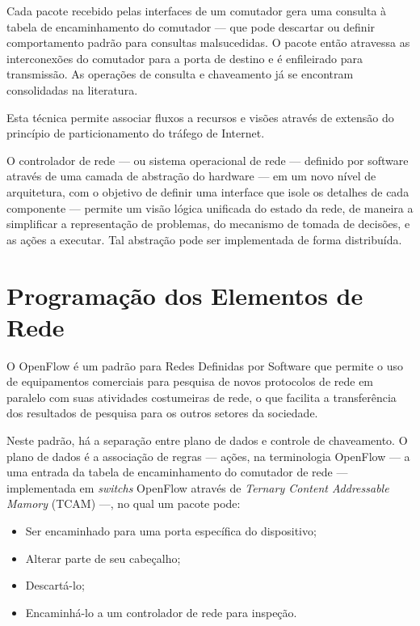 Cada pacote recebido pelas interfaces de um comutador gera uma consulta à tabela de encaminhamento do comutador --- que pode descartar ou definir comportamento padrão para consultas malsucedidas. O pacote então atravessa as interconexões do comutador para a porta de destino e é enfileirado para transmissão. As operações de consulta e chaveamento já se encontram consolidadas na literatura.

Esta técnica permite associar fluxos a recursos e visões através de extensão do princípio de particionamento do tráfego de Internet.

O controlador de rede --- ou sistema operacional de rede --- definido por software através de uma camada de abstração do hardware --- em um novo nível de arquitetura, com o objetivo de definir uma interface que isole os detalhes de cada componente --- permite um visão lógica unificada do estado da rede, de maneira a simplificar a representação de problemas, do mecanismo de tomada de decisões, e as ações a executar. Tal abstração pode ser implementada de forma distribuída.


\section*{Programação dos Elementos de Rede}

O OpenFlow é um padrão para Redes Definidas por Software que permite o uso de equipamentos comerciais para pesquisa de novos protocolos de rede em paralelo com suas atividades costumeiras de rede, o que facilita a transferência dos resultados de pesquisa para os outros setores da sociedade.

Neste padrão, há a separação entre plano de dados e controle de chaveamento. O plano de dados é a associação de regras --- ações, na terminologia OpenFlow --- a uma entrada da tabela de encaminhamento do comutador de rede --- implementada em \textit{switchs} OpenFlow através de \textit{Ternary Content Addressable Mamory} (TCAM) ---, no qual um pacote pode:

\vspace{-15pt}
\begin{itemize}
  \item Ser encaminhado para uma porta específica do dispositivo;
  \item Alterar parte de seu cabeçalho;
  \item Descartá-lo;
  \item Encaminhá-lo a um controlador de rede para inspeção.
\end{itemize}

